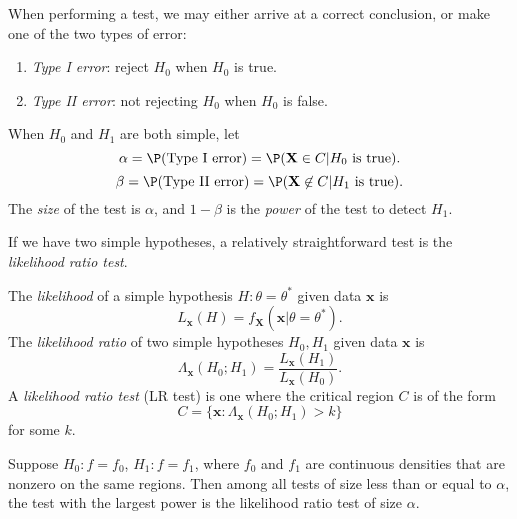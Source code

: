 \documentclass[a4paper]{article}
\begin{document}
When performing a test, we may either arrive at a correct conclusion, or make one of the two types of error:
\begin{defi}\leavevmode
  \begin{enumerate}
    \item \emph{Type I error}: reject $H_0$ when $H_0$ is true.
    \item \emph{Type II error}: not rejecting $H_0$ when $H_0$ is false.
  \end{enumerate}
\end{defi}

\begin{defi}
When $H_0$ and $H_1$ are both simple, let
\[
  \alpha = \P(\text{Type I error}) = \P(\mathbf{X}\in C|H_0\text{ is true}).
\]
\[
  \beta = \P(\text{Type II error}) = \P(\mathbf{X}\not\in C|H_1\text{ is true}).
\]
The \emph{size} of the test is $\alpha$, and $1 - \beta$ is the \emph{power} of the test to detect $H_1$.
\end{defi}

If we have two simple hypotheses, a relatively straightforward test is the \emph{likelihood ratio test}.
\begin{defi}[Likelihood]
  The \emph{likelihood} of a simple hypothesis $H: \theta = \theta^*$ given data $\mathbf{x}$ is
  \[
    L_\mathbf{x}(H) = f_\mathbf{X}(\mathbf{x}|\theta = \theta^*).
  \]
  The \emph{likelihood ratio} of two simple hypotheses $H_0, H_1$ given data $\mathbf{x}$ is
  \[
    \Lambda_\mathbf{x}(H_0; H_1) = \frac{L_\mathbf{x}(H_1)}{L_\mathbf{x}(H_0)}.
  \]
  A \emph{likelihood ratio test} (LR test) is one where the critical region $C$ is of the form
  \[
    C = \{\mathbf{x}: \Lambda_\mathbf{x} (H_0; H_1) > k\}
  \]
  for some $k$.
\end{defi}

\begin{lemma}
  Suppose $H_0: f = f_0$, $H_1: f = f_1$, where $f_0$ and $f_1$ are continuous densities that are nonzero on the same regions. Then among all tests of size less than or equal to $\alpha$, the test with the largest power is the likelihood ratio test of size $\alpha$.

\end{lemma}
\end{document}
